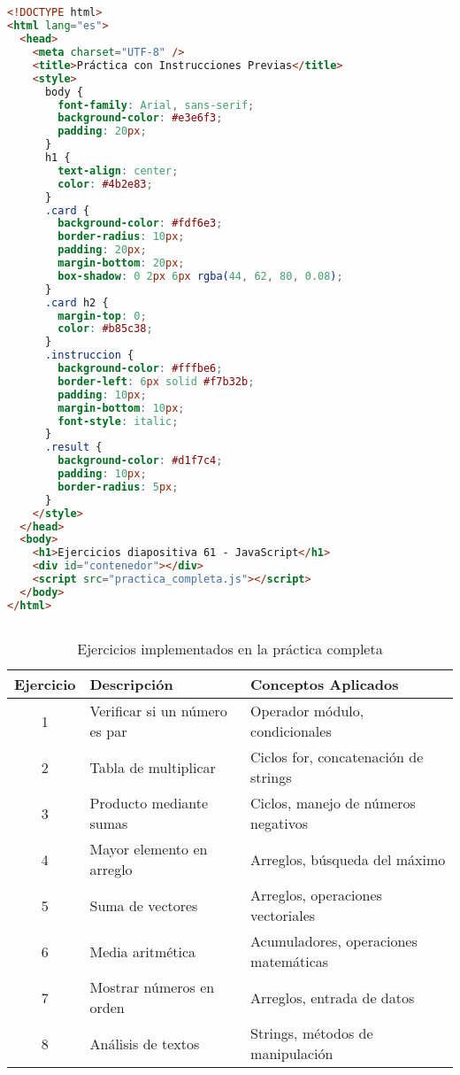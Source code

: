 \documentclass[10pt,a4paper]{article}
\begin{document}
\subsection{\color{colorESCOM}{Código HTML}}
\begin{lstlisting}[language=HTML]
<!DOCTYPE html>
<html lang="es">
  <head>
    <meta charset="UTF-8" />
    <title>Práctica con Instrucciones Previas</title>
    <style>
      body {
        font-family: Arial, sans-serif;
        background-color: #e3e6f3;
        padding: 20px;
      }
      h1 {
        text-align: center;
        color: #4b2e83;
      }
      .card {
        background-color: #fdf6e3;
        border-radius: 10px;
        padding: 20px;
        margin-bottom: 20px;
        box-shadow: 0 2px 6px rgba(44, 62, 80, 0.08);
      }
      .card h2 {
        margin-top: 0;
        color: #b85c38;
      }
      .instruccion {
        background-color: #fffbe6;
        border-left: 6px solid #f7b32b;
        padding: 10px;
        margin-bottom: 10px;
        font-style: italic;
      }
      .result {
        background-color: #d1f7c4;
        padding: 10px;
        border-radius: 5px;
      }
    </style>
  </head>
  <body>
    <h1>Ejercicios diapositiva 61 - JavaScript</h1>
    <div id="contenedor"></div>
    <script src="practica_completa.js"></script>
  </body>
</html>
\end{lstlisting}

\subsection{\color{colorESCOM}{Ejercicios Implementados}}
\begin{table}[H]
	\centering
	\begin{tabular}{|c|p{5cm}|p{6cm}|}
		\hline
		\textbf{Ejercicio} & \textbf{Descripción} & \textbf{Conceptos Aplicados} \\ \hline
		1 & Verificar si un número es par & Operador módulo, condicionales \\ \hline
		2 & Tabla de multiplicar & Ciclos for, concatenación de strings \\ \hline
		3 & Producto mediante sumas & Ciclos, manejo de números negativos \\ \hline
		4 & Mayor elemento en arreglo & Arreglos, búsqueda del máximo \\ \hline
		5 & Suma de vectores & Arreglos, operaciones vectoriales \\ \hline
		6 & Media aritmética & Acumuladores, operaciones matemáticas \\ \hline
		7 & Mostrar números en orden & Arreglos, entrada de datos \\ \hline
		8 & Análisis de textos & Strings, métodos de manipulación \\ \hline
	\end{tabular}
	\caption{Ejercicios implementados en la práctica completa}
	\label{tab:ejercicios_practica}
\end{table}
\end{document}

